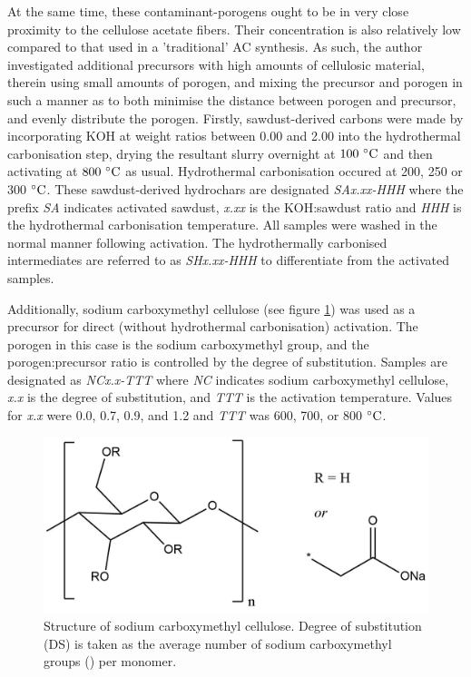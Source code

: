 At the same time, these contaminant-porogens ought to be in very close proximity to the cellulose acetate fibers. Their concentration is also relatively low compared to that used in a 'traditional' AC synthesis. As such, the author investigated additional precursors with high amounts of cellulosic material, therein using small amounts of porogen, and mixing the precursor and porogen in such a manner as to both minimise the distance between porogen and precursor, and evenly distribute the porogen. Firstly, sawdust-derived carbons were made by incorporating KOH at weight ratios between 0.00 and 2.00 into the hydrothermal carbonisation step, drying the resultant slurry overnight at $\rm 100\  ^{\circ}C$ and then activating at $\rm 800\ ^{\circ}C$ as usual. Hydrothermal carbonisation occured at 200, 250 or 300 $\rm ^{\circ}C$. These sawdust-derived hydrochars are designated \textit{SAx.xx-HHH} where the prefix \textit{SA} indicates activated sawdust, \textit{x.xx} is the KOH:sawdust ratio and \textit{HHH} is the hydrothermal carbonisation temperature. All samples were washed in the normal manner following activation. The hydrothermally carbonised intermediates are referred to as \textit{SHx.xx-HHH} to differentiate from the activated samples.

Additionally, sodium carboxymethyl cellulose (see figure \ref{fig:nc_structure}) was used as a precursor for direct (without hydrothermal carbonisation) activation. The porogen in this case is the sodium carboxymethyl group, and the porogen:precursor ratio is controlled by the degree of substitution. Samples are designated as \textit{NCx.x-TTT} where \textit{NC} indicates sodium carboxymethyl cellulose, \textit{x.x} is the degree of substitution, and \textit{TTT} is the activation temperature. Values for \textit{x.x} were 0.0, 0.7, 0.9, and 1.2 and \textit{TTT} was 600, 700, or 800 $\rm ^{\circ}C$.

\begin{figure}[h]
    \centering
    \includegraphics[width=0.8\columnwidth]{4-syntheses/figs/nc_structure.png}
    \caption{Structure of sodium carboxymethyl cellulose. Degree of substitution (DS) is taken as the average number of sodium carboxymethyl groups () per monomer.}
    \label{fig:nc_structure}
\end{figure}


